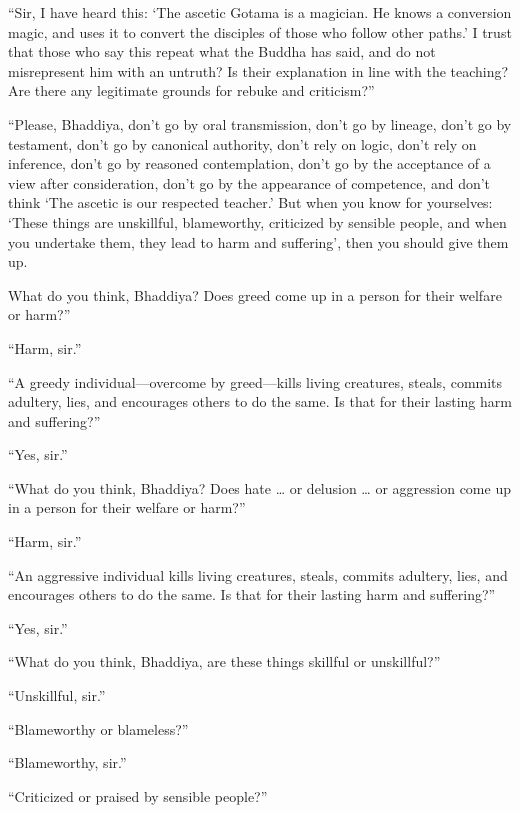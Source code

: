 \documentclass[12pt,openany]{book}%
\begin{document}
“Sir, I have heard this: ‘The ascetic Gotama is a magician. He knows a conversion magic, and uses it to convert the disciples of those who follow other paths.’ I trust that those who say this repeat what the Buddha has said, and do not misrepresent him with an untruth? Is their explanation in line with the teaching? Are there any legitimate grounds for rebuke and criticism?” 

“Please, Bhaddiya, don’t go by oral transmission, don’t go by lineage, don’t go by testament, don’t go by canonical authority, don’t rely on logic, don’t rely on inference, don’t go by reasoned contemplation, don’t go by the acceptance of a view after consideration, don’t go by the appearance of competence, and don’t think ‘The ascetic is our respected teacher.’ But when you know for yourselves: ‘These things are unskillful, blameworthy, criticized by sensible people, and when you undertake them, they lead to harm and suffering’, then you should give them up. 

What do you think, Bhaddiya? Does greed come up in a person for their welfare or harm?” 

“Harm, sir.” 

“A greedy individual—overcome by greed—kills living creatures, steals, commits adultery, lies, and encourages others to do the same. Is that for their lasting harm and suffering?” 

“Yes, sir.” 

“What do you think, Bhaddiya? Does hate … or delusion … or aggression come up in a person for their welfare or harm?” 

“Harm, sir.” 

“An aggressive individual kills living creatures, steals, commits adultery, lies, and encourages others to do the same. Is that for their lasting harm and suffering?” 

“Yes, sir.” 

“What do you think, Bhaddiya, are these things skillful or unskillful?” 

“Unskillful, sir.” 

“Blameworthy or blameless?” 

“Blameworthy, sir.” 

“Criticized or praised by sensible people?” 
\end{document}

